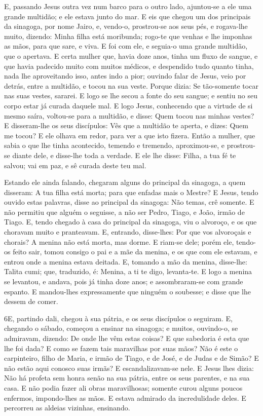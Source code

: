 E, passando Jesus outra vez num barco para o outro lado,
ajuntou-se a ele uma grande multidão; e ele estava junto do mar.
E eis que chegou um dos principais da sinagoga, por nome
Jairo, e, vendo-o, prostrou-se aos seus pés, e rogava-lhe
muito, dizendo: Minha filha está moribunda; rogo-te que venhas e lhe
imponhas as mãos, para que sare, e viva. E foi com ele, e
seguia-o uma grande multidão, que o apertava. E certa mulher
que, havia doze anos, tinha um fluxo de sangue, e que havia
padecido muito com muitos médicos, e despendido tudo quanto tinha,
nada lhe aproveitando isso, antes indo a pior; ouvindo falar
de Jesus, veio por detrás, entre a multidão, e tocou na sua veste.
Porque dizia: Se tão-somente tocar nas suas vestes, sararei.
E logo se lhe secou a fonte do seu sangue; e sentiu no seu
corpo estar já curada daquele mal. E logo Jesus, conhecendo
que a virtude de si mesmo saíra, voltou-se para a multidão, e disse:
Quem tocou nas minhas vestes? E disseram-lhe os seus
discípulos: Vês que a multidão te aperta, e dizes: Quem me tocou?
E ele olhava em redor, para ver a que isto fizera.
Então a mulher, que sabia o que lhe tinha acontecido, temendo
e tremendo, aproximou-se, e prostrou-se diante dele, e disse-lhe
toda a verdade. E ele lhe disse: Filha, a tua fé te salvou;
vai em paz, e sê curada deste teu mal.

Estando ele ainda falando, chegaram alguns do principal da
sinagoga, a quem disseram: A tua filha está morta; para que enfadas
mais o Mestre? E Jesus, tendo ouvido estas palavras, disse ao
principal da sinagoga: Não temas, crê somente. E não permitiu
que alguém o seguisse, a não ser Pedro, Tiago, e João, irmão de
Tiago. E, tendo chegado à casa do principal da sinagoga, viu
o alvoroço, e os que choravam muito e pranteavam. E,
entrando, disse-lhes: Por que vos alvoroçais e chorais? A menina não
está morta, mas dorme. E riam-se dele; porém ele, tendo-os
feito sair, tomou consigo o pai e a mãe da menina, e os que com ele
estavam, e entrou onde a menina estava deitada. E, tomando a
mão da menina, disse-lhe: Talita cumi; que, traduzido, é: Menina, a
ti te digo, levanta-te. E logo a menina se levantou, e
andava, pois já tinha doze anos; e assombraram-se com grande
espanto. E mandou-lhes expressamente que ninguém o soubesse;
e disse que lhe dessem de comer.

\medskip

\lettrine{6} E, partindo dali, chegou à sua pátria, e os seus
discípulos o seguiram. E, chegando o sábado, começou a ensinar
na sinagoga; e muitos, ouvindo-o, se admiravam, dizendo: De onde lhe
vêm estas coisas? E que sabedoria é esta que lhe foi dada? E como se
fazem tais maravilhas por suas mãos? Não é este o carpinteiro,
filho de Maria, e irmão de Tiago, e de José, e de Judas e de Simão?
E não estão aqui conosco suas irmãs? E escandalizavam-se nele. E
Jesus lhes dizia: Não há profeta sem honra senão na sua pátria,
entre os seus parentes, e na sua casa. E não podia fazer ali
obras maravilhosas; somente curou alguns poucos enfermos,
impondo-lhes as mãos. E estava admirado da incredulidade deles.
E percorreu as aldeias vizinhas, ensinando.

